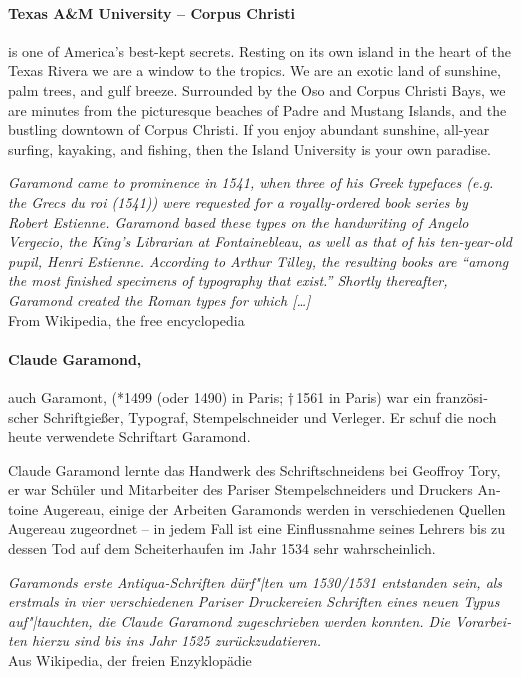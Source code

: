 \documentclass[pagesize,DIV14]{scrartcl}
\begin{document}
\begin{multicols}{2}

\paragraph*{Texas A\&M University -- Corpus Christi} is one of America’s best-kept secrets. Resting on its own island in the heart of the Texas Rivera we are a window to the tropics. We are an exotic land of sunshine, palm trees, and gulf breeze. Surrounded by the Oso and Corpus Christi Bays, we are minutes from the picturesque beaches of Padre and Mustang Islands, and the bustling downtown of Corpus Christi. If you enjoy abundant sunshine, all-year surfing, kayaking, and fishing, then the Island University is your own paradise.

\textit{Garamond came to prominence in 1541, when three of his Greek typefaces (e.g. the Grecs du roi (1541)) were requested for a royally-ordered book series by Robert Estienne. Garamond based these types on the handwriting of Angelo Vergecio, the King’s Librarian at Fontainebleau, as well as that of his ten-year-old pupil, Henri Estienne. According to Arthur Tilley, the resulting books are “among the most finished specimens of typography that exist.” Shortly thereafter, Garamond created the Roman types for which […]}\\
{\scriptsize From Wikipedia, the free encyclopedia}

\begin{german}
\paragraph*{Claude Garamond,} auch Garamont, (*1499 (oder 1490) in Paris; †\,1561 in Paris) war ein französischer Schriftgießer, Typograf, Stempelschneider und Verleger. Er schuf die noch heute verwendete Schriftart Garamond.

Claude Garamond lernte das Handwerk des Schriftschneidens bei Geoffroy Tory, er war Schüler und Mitarbeiter des Pariser Stempelschneiders und Druckers Antoine Augereau, einige der Arbeiten Garamonds werden in verschiedenen Quellen Augereau zugeordnet – in jedem Fall ist eine Einflussnahme seines Lehrers bis zu dessen Tod auf dem Scheiterhaufen im Jahr 1534 sehr wahrscheinlich.

\textit{Garamonds erste Antiqua-Schriften dürf"|ten um 1530/1531 entstanden sein, als erstmals in vier verschiedenen Pariser Druckereien Schriften eines neuen Typus auf"|tauchten, die Claude Garamond zugeschrieben werden konnten. Die Vorarbeiten hierzu sind bis ins Jahr 1525 zurückzudatieren.}\\
{\scriptsize Aus Wikipedia, der freien Enzyklopädie}
\end{german}


\end{multicols}
\end{document}
